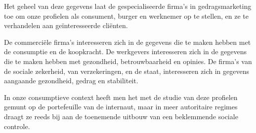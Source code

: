 {
Het geheel van deze gegevens laat de gespecialiseerde firma's in
gedragsmarketing toe om onze profielen als consument, burger en
werknemer op te stellen, en ze te verhandelen aan ge\"interesseerde
cli\"enten.

De commerci\"ele firma's interesseren zich in de gegevens die te maken
hebben met de consumptie en de koopkracht. De werkgevers interesseren
zich in de gegevens die te maken hebben met gezondheid, betrouwbaarheid
en opinies. De firma's van de sociale zekerheid, van verzekeringen, en
de staat, interesseren zich in gegevens aangaande gezondheid, gedrag en
stabiliteit. 

In onze consumptieve context heeft men het met de studie van deze
profielen gemunt op de portefeuille van de internaut, maar in meer
autoritaire regimes draagt ze reeds bij aan de toenemende uitbouw van
een beklemmende sociale controle.
\godown[2em]
\midaligned{}\par}
\godown[2em]
